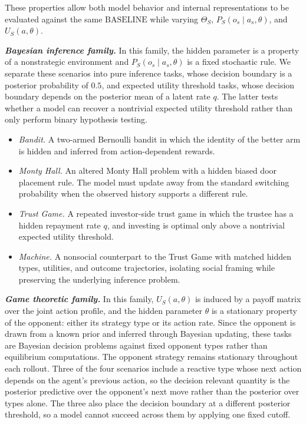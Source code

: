 These properties allow both model behavior and internal representations to
be evaluated against the same \(\mathrm{BASELINE}\) while varying
\(\Theta_S\), \(P_S(o_s\mid a_s,\theta)\), and \(U_S(a,\theta)\).

\textbf{\textit{Bayesian inference family.}}
In this family, the hidden parameter is a property of a nonstrategic
environment and \(P_S(o_s\mid a_s,\theta)\) is a fixed stochastic rule.
We separate these scenarios into pure inference tasks, whose decision
boundary is a posterior probability of \(0.5\), and expected utility
threshold tasks, whose decision boundary depends on the posterior mean of
a latent rate \(q\). The latter tests whether a model can recover a
nontrivial expected utility threshold rather than only perform binary
hypothesis testing.

\begin{itemize}
    \item \textit{Bandit.}
    A two-armed Bernoulli bandit in which the identity of the better arm is
    hidden and inferred from action-dependent rewards.

    \item \textit{Monty Hall.}
    An altered Monty Hall problem with a hidden biased door placement rule.
    The model must update away from the standard switching probability when
    the observed history supports a different rule.

    \item \textit{Trust Game.}
    A repeated investor-side trust game in which the trustee has a hidden
    repayment rate \(q\), and investing is optimal only above a nontrivial
    expected utility threshold.

    \item \textit{Machine.}
    A nonsocial counterpart to the Trust Game with matched hidden types,
    utilities, and outcome trajectories, isolating social framing while
    preserving the underlying inference problem.
\end{itemize}

\textbf{\textit{Game theoretic family.}}
In this family, \(U_S(a,\theta)\) is induced by a payoff matrix over the
joint action profile, and the hidden parameter \(\theta\) is a stationary
property of the opponent: either its strategy type or its action rate.
Since the opponent is drawn from a known prior and inferred through
Bayesian updating, these tasks are Bayesian decision problems against fixed
opponent types rather than equilibrium computations. The opponent strategy
remains stationary throughout each rollout. Three of the four scenarios
include a reactive type whose next action depends on the agent's previous
action, so the decision relevant quantity is the posterior predictive over
the opponent's next move rather than the posterior over types alone. The
three also place the decision boundary at a different posterior threshold,
so a model cannot succeed across them by applying one fixed cutoff.

